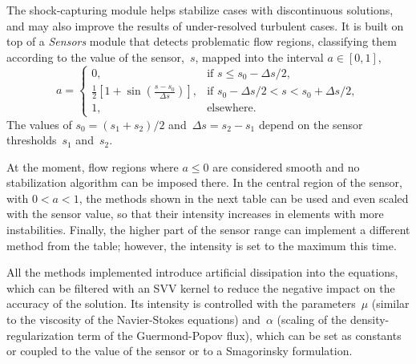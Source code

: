 \documentclass[a4paper,10pt]{report}
\begin{document}
The shock-capturing module helps stabilize cases with discontinuous solutions, and may also improve the results of under-resolved turbulent cases. It is built on top of a \textit{Sensors} module that detects problematic flow regions, classifying them according to the value of the sensor,~$s$, mapped into the interval $a \in [0,1]$,
%
\begin{equation*}
    a = \left\{\begin{array}{ll}
        0, & \text{if } s \leq s_0 - \Delta s / 2, \\
        \frac{1}{2}\left[1+\sin\left(\frac{s-s_0}{\Delta s}\right)\right], & \text{if } s_0 - \Delta s / 2 < s < s_0 + \Delta s / 2,  \\
        1, & \text{elsewhere}.
    \end{array}\right.
\end{equation*}
%
The values of $s_0 = (s_1 + s_2)/2$ and~$\Delta s = s_2 - s_1$ depend on the sensor thresholds~$s_1$ and~$s_2$.

At the moment, flow regions where $a \leq 0$ are considered smooth and no stabilization algorithm can be imposed there. In the central region of the sensor, with $0 < a < 1$, the methods shown in the next table can be used and even scaled with the sensor value, so that their intensity increases in elements with more instabilities. Finally, the higher part of the sensor range can implement a different method from the table; however, the intensity is set to the maximum this time.

All the methods implemented introduce artificial dissipation into the equations, which can be filtered with an SVV kernel to reduce the negative impact on the accuracy of the solution. Its intensity is controlled with the parameters~$\mu$ (similar to the viscosity of the Navier-Stokes equations) and~$\alpha$ (scaling of the density-regularization term of the Guermond-Popov flux), which can be set as constants or coupled to the value of the sensor or to a Smagorinsky formulation.
\end{document}
